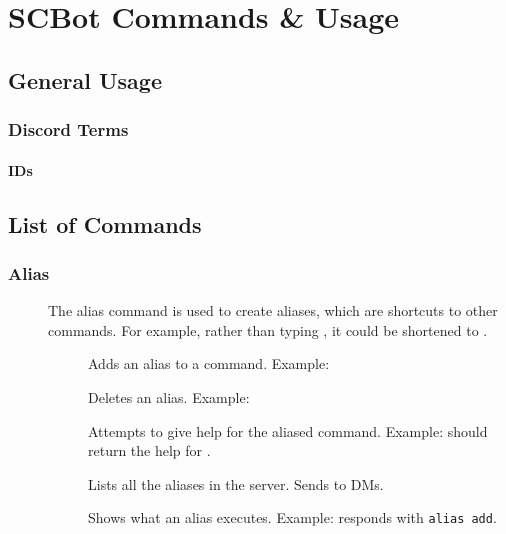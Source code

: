 \section{SCBot Commands \& Usage}

\subsection{General Usage}

\subsubsection{Discord Terms}
\paragraph{IDs}
\label{discord:message-id}

\subsection{List of Commands}

\subsubsection{Alias}
\begin{description}
	\item[]\label{com:alias}
		The alias command is used to create aliases, which are shortcuts to other commands. For example, rather than typing , it could be shortened to .
		
	\begin{description}
		\item[]\label{com:alias-add}
			Adds an alias to a command. Example: 
			
		\item[]\label{com:alias-del}
			Deletes an alias. Example: 
			
		\item[]\label{com:alias-help}
			Attempts to give help for the aliased command. Example:  should return the help for .
			
		\item[]\label{com:alias-list}
			Lists all the aliases in the server. Sends to DMs.
			
		\item[]\label{com:alias-show}
			Shows what an alias executes. Example:  responds with \texttt{alias add}.
	\end{description}
\end{description}

